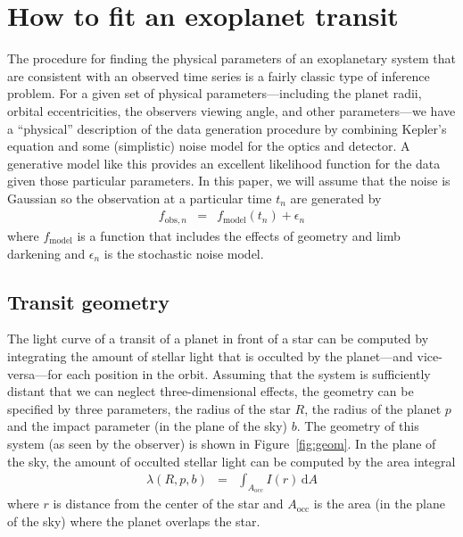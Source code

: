 \documentclass[12pt,preprint]{aastex}
\newcommand{\Fig}[1]{Figure~\ref{fig:#1}}
\newcommand{\fig}[1]{\Fig{#1}}
\newcommand{\eqlabel}[1]{\label{eq:#1}}
\newcommand{\dd}{\mathrm{d}}
\begin{document}
\section{How to fit an exoplanet transit}

The procedure for finding the physical parameters of an exoplanetary system
that are consistent with an observed time series is a fairly classic type of
inference problem. For a given set of physical parameters---including the
planet radii, orbital eccentricities, the observers viewing angle, and other
parameters---we have a ``physical'' description of the data generation
procedure by combining Kepler's equation and some (simplistic) noise model for
the optics and detector. A generative model like this provides an excellent
likelihood function for the data given those particular parameters. In this
paper, we will assume that the noise is Gaussian so the observation at a
particular time $t_n$ are generated by
\begin{eqnarray}
    f_{\mathrm{obs},n} & = & f_\mathrm{model} (t_n) + \epsilon_n
\end{eqnarray}
where $f_\mathrm{model}$ is a function that includes the effects of geometry
and limb darkening and $\epsilon_n$ is the stochastic noise model.

\subsection{Transit geometry}

The light curve of a transit of a planet in front of a star can be computed by
integrating the amount of stellar light that is occulted by the planet---and
vice-versa---for
each position in the orbit. Assuming that the system is sufficiently distant
that we can neglect three-dimensional effects, the geometry can be specified
by three parameters, the radius of the star $R$, the radius of the planet $p$
and the impact parameter (in the plane of the sky) $b$. The geometry
of this system (as seen by the observer) is shown in \fig{geom}. In the plane
of the sky, the amount of occulted stellar light can be computed by the area
integral
\begin{eqnarray}\eqlabel{general-occ}
    \lambda (R, p, b) & = & \int_{A_\mathrm{occ}} I(r) \, \dd A
\end{eqnarray}
where $r$ is distance from the center of the star and $A_\mathrm{occ}$ is the
area (in the plane of the sky) where the planet overlaps the star.
\end{document}
